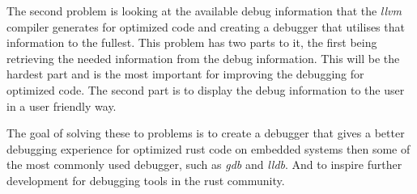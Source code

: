 The second problem is looking at the available debug information that the \emph{llvm} compiler generates for optimized code and creating a debugger that utilises that information to the fullest.
This problem has two parts to it, the first being retrieving the needed information from the debug information.
This will be the hardest part and is the most important for improving the debugging for optimized code.
The second part is to display the debug information to the user in a user friendly way.


The goal of solving these to problems is to create a debugger that gives a better debugging experience for optimized rust code on embedded systems then some of the most commonly used debugger, such as \emph{gdb} and \emph{lldb}.
And to inspire further development for debugging tools in the rust community.

